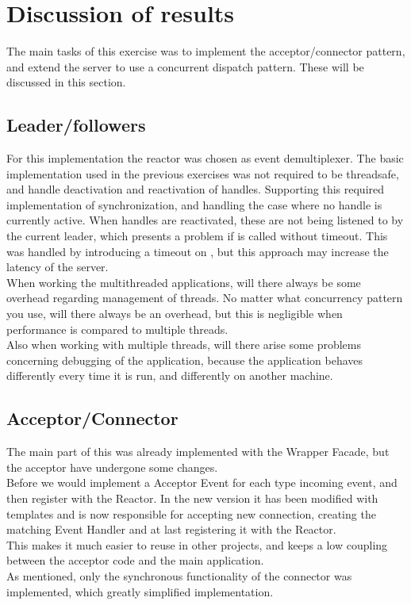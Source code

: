 \documentclass[Main]{subfiles}
\begin{document}
\chapter{Discussion of results}

The main tasks of this exercise was to implement the acceptor/connector pattern, and extend the server to use a concurrent dispatch pattern. These will be discussed in this section.

\section*{Leader/followers}

For this implementation the reactor was chosen as event demultiplexer. The basic implementation used in the previous exercises was not required to be threadsafe, and handle deactivation and reactivation of handles. Supporting this required implementation of synchronization, and handling the case where no handle is currently active. When handles are reactivated, these are not being listened to by the current leader, which presents a problem if  is called without timeout. This was handled by introducing a timeout on , but this approach may increase the latency of the server.\\
When working the multithreaded applications, will there always be some overhead regarding management of threads.
No matter what concurrency pattern you use, will there always be an overhead, but this is negligible when performance is compared to multiple threads.\\
Also when working with multiple threads, will there arise some problems concerning debugging of the application, because the application behaves differently every time it is run, and differently on another machine.

\section*{Acceptor/Connector}
The main part of this was already implemented with the Wrapper Facade, but the acceptor have undergone some changes.\\
Before we would implement a Acceptor Event for each type incoming event, and then register with the Reactor.
In the new version it has been modified with templates and is now responsible for accepting new connection, creating the matching Event Handler and at last registering it with the Reactor.\\
This makes it much easier to reuse in other projects, and keeps a low coupling between the acceptor code and the main application.\\
As mentioned, only the synchronous functionality of the connector was implemented, which greatly simplified implementation. 
\end{document}
